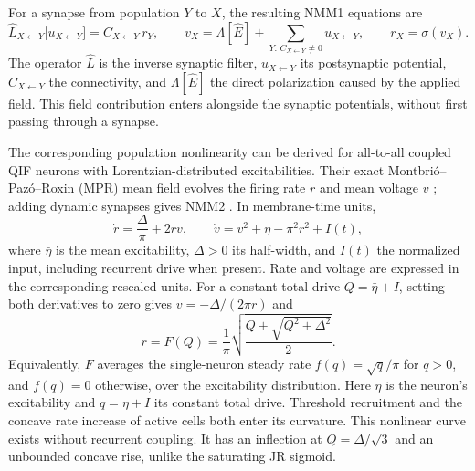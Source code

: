 \documentclass[11pt,a4paper]{article}
\newcommand{\Sig}{\sigma}
\begin{document}
For a synapse from population $Y$ to $X$, the resulting NMM1 equations are
\cite{ruffini2025rosetta}
\begin{equation}
\hat L_{X\leftarrow Y}\big[u_{X\leftarrow Y}\big]=C_{X\leftarrow Y}\,r_Y,\qquad
v_X=\Lambda[\hat E]+\!\!\sum_{Y:\,C_{X\leftarrow Y}\neq0}\!\!u_{X\leftarrow Y},\qquad
r_X=\Sig(v_X).
\label{eq:nmm1}
\end{equation}
The operator $\hat L$ is the inverse synaptic filter, $u_{X\leftarrow Y}$ its
postsynaptic potential, $C_{X\leftarrow Y}$ the connectivity, and $\Lambda[\hat E]$
the direct polarization caused by the applied field. This field contribution enters
alongside the synaptic potentials, without first passing through a synapse.

The corresponding population nonlinearity can be derived for all-to-all coupled
QIF neurons with Lorentzian-distributed excitabilities. Their exact
Montbri\'o--Paz\'o--Roxin (MPR) mean field evolves the firing rate $r$ and mean voltage
$v$ \cite{montbrio2015}; adding dynamic synapses gives NMM2
\cite{ruffini2021nmm2,clusella2023}. In membrane-time units,
\begin{equation}
\dot r=\frac{\Delta}{\pi}+2rv,\qquad
\dot v=v^2+\bar\eta-\pi^2r^2+I(t),
\label{eq:mpr}
\end{equation}
where $\bar\eta$ is the mean excitability, $\Delta>0$ its half-width, and $I(t)$ the
normalized input, including recurrent drive when present. Rate and voltage are
expressed in the corresponding rescaled units. For a constant total drive
$Q=\bar\eta+I$, setting both derivatives to zero gives $v=-\Delta/(2\pi r)$ and
\begin{equation}
r=F(Q)=\frac{1}{\pi}\sqrt{\frac{Q+\sqrt{Q^2+\Delta^2}}{2}} .
\label{eq:Fmpr}
\end{equation}
Equivalently, $F$ averages the single-neuron steady rate $f(q)=\sqrt q/\pi$ for
$q>0$, and $f(q)=0$ otherwise, over the excitability distribution. Here $\eta$ is
the neuron's excitability and $q=\eta+I$ its constant total drive. Threshold
recruitment and the concave rate increase of active cells both enter its curvature. This nonlinear curve exists
without recurrent coupling. It has an inflection at
$Q=\Delta/\sqrt3$ and an unbounded concave rise, unlike the saturating JR sigmoid.
\end{document}
